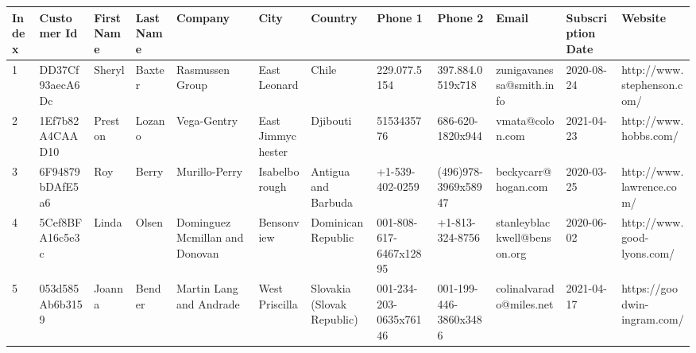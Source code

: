 \documentclass[11pt,a4paper]{article}
\begin{document}
\begin{table}[h]
\begin{tabular}{|l|l|l|l|l|l|l|l|l|l|l|l|}
\hline
Index & Customer Id & First Name & Last Name & Company & City & Country & Phone 1 & Phone 2 & Email & Subscription Date & Website \\ \hline
1 & DD37Cf93aecA6Dc & Sheryl & Baxter & Rasmussen Group & East Leonard & Chile & 229.077.5154 & 397.884.0519x718 & zunigavanessa@smith.info & 2020-08-24 & http://www.stephenson.com/ \\ \hline
2 & 1Ef7b82A4CAAD10 & Preston & Lozano & Vega-Gentry & East Jimmychester & Djibouti & 5153435776 & 686-620-1820x944 & vmata@colon.com & 2021-04-23 & http://www.hobbs.com/ \\ \hline
3 & 6F94879bDAfE5a6 & Roy & Berry & Murillo-Perry & Isabelborough & Antigua and Barbuda & +1-539-402-0259 & (496)978-3969x58947 & beckycarr@hogan.com & 2020-03-25 & http://www.lawrence.com/ \\ \hline
4 & 5Cef8BFA16c5e3c & Linda & Olsen & Dominguez	Mcmillan and Donovan & Bensonview & Dominican Republic & 001-808-617-6467x12895 & +1-813-324-8756 & stanleyblackwell@benson.org & 2020-06-02 & http://www.good-lyons.com/ \\ \hline
5 & 053d585Ab6b3159 & Joanna & Bender & Martin	Lang and Andrade & West Priscilla & Slovakia (Slovak Republic) & 001-234-203-0635x76146 & 001-199-446-3860x3486 & colinalvarado@miles.net & 2021-04-17 & https://goodwin-ingram.com/ \\ \hline
\end{tabular}
\end{table}
\end{document}
